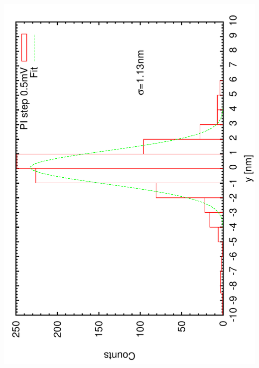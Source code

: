\documentclass[a4paper,11pt]{book}
\begin{document}
\includegraphics[angle=-90,scale=0.15]{imagestep01.pdf}
\end{document}
